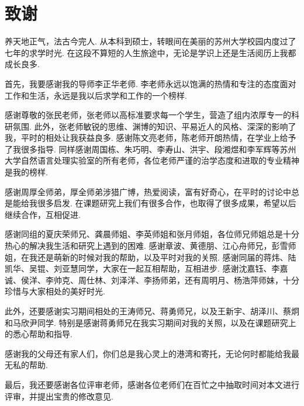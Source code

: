\chapter{致谢}

养天地正气，法古今完人.
从本科到硕士，转眼间在美丽的苏州大学校园内度过了七年的求学时光.
在这段不算短的人生旅途中，无论是学识上还是生活阅历上我都成长良多.

首先，我要感谢我的导师李正华老师.
李老师永远以饱满的热情和专注的态度面对工作和生活，永远是我以后求学和工作的一个榜样.

感谢尊敬的张民老师，张老师以高标准要求每一个学生，营造了组内浓厚专一的科研氛围.
此外，张老师敏锐的思维、渊博的知识、平易近人的风格、深深的影响了我，平时的相处让我获益良多.
感谢陈文亮老师，陈老师开朗热情，在学业上给予了我很多指导.
同样感谢周国栋、朱巧明、李寿山、洪宇、段湘煜和李军辉等苏州大学自然语言处理实验室的所有老师，各位老师严谨的治学态度和进取的专业精神是我的榜样.

感谢周厚全师弟，厚全师弟涉猎广博，热爱阅读，富有好奇心，在平时的讨论中总是能给我很多启发.
在课题研究上我们有很多合作，也取得了很多成果，希望以后继续合作，互相促进.

感谢同组的夏庆荣师兄、龚晨师姐、李英师姐和张月师姐，各位师兄师姐总是十分热心的解决我生活和研究上遇到的困难.
感谢章波、黄德朋、江心舟师兄，彭雪师姐，在我还是萌新的时候对我的帮助，以及平时对我的关照.
感谢同届的蒋炜、陆凯华、吴锟、刘亚慧同学，大家在一起互相帮助，互相进步.
感谢沈嘉钰、李嘉诚、侯洋、李帅克、周仕林、刘泽洋、李扬师弟，还有周明月、杨浩萍师妹，十分珍惜与大家相处的美好时光.

此外，还要感谢实习期间相处的王涛师兄、蒋勇师兄，以及王新宇、胡泽川、蔡炯和马欣尹同学.
特别是感谢蒋勇师兄在我实习期间对我的关照，以及在课题研究上的悉心帮助和指导.

感谢我的父母还有家人们，你们总是我心灵上的港湾和寄托，无论何时都能给我最无私的帮助.

最后，我还要感谢各位评审老师，感谢各位老师们在百忙之中抽取时间对本文进行评审，并提出宝贵的修改意见.

